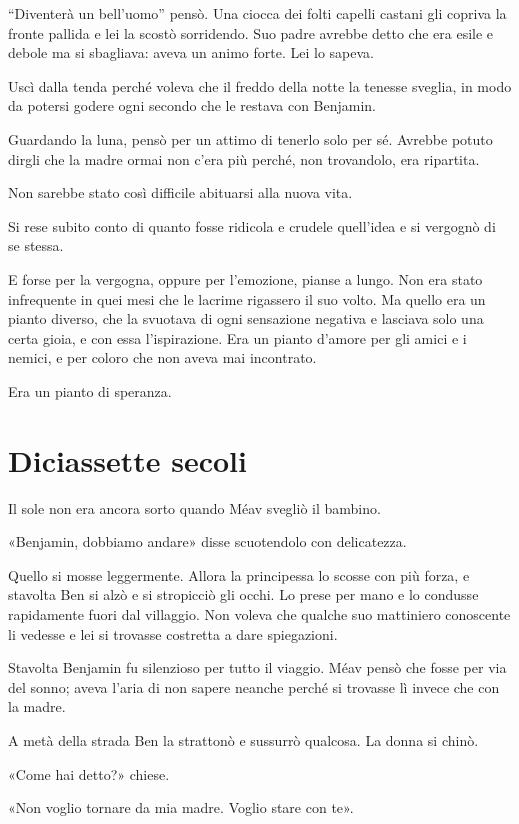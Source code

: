 \documentclass[a4paper,11pt,oneside,openright,final]{memoir}
\begin{document}
``Diventerà un bell'uomo'' pensò. Una ciocca dei folti capelli castani gli
copriva la fronte pallida e lei la scostò sorridendo. Suo padre avrebbe detto
che era esile e debole ma si sbagliava: aveva un animo forte. Lei lo sapeva.

Uscì dalla tenda perché voleva che il freddo della notte la tenesse sveglia,
in modo da potersi godere ogni secondo che le restava con Benjamin.

Guardando la luna, pensò per un attimo di tenerlo solo per sé. Avrebbe potuto
dirgli che la madre ormai non c'era più perché, non trovandolo, era ripartita.

Non sarebbe stato così difficile abituarsi alla nuova vita.

Si rese subito conto di quanto fosse ridicola e crudele quell'idea e si
vergognò di se stessa.

E forse per la vergogna, oppure per l'emozione, pianse a lungo. Non era stato
infrequente in quei mesi che le lacrime rigassero il suo volto. Ma quello era un
pianto diverso, che la svuotava di ogni sensazione negativa e lasciava solo una
certa gioia, e con essa l'ispirazione. Era un pianto d'amore per gli amici e i
nemici, e per coloro che non aveva mai incontrato.

Era un pianto di speranza.

\chapter{Diciassette secoli}

Il sole non era ancora sorto quando Méav svegliò il bambino.

«Benjamin, dobbiamo andare» disse scuotendolo con delicatezza.

Quello si mosse leggermente. Allora la principessa lo scosse con più forza, e
stavolta Ben si alzò e si stropicciò gli occhi. Lo prese per mano e lo
condusse rapidamente fuori dal villaggio. Non voleva che qualche suo mattiniero
conoscente li vedesse e lei si trovasse costretta a dare spiegazioni.

Stavolta Benjamin fu silenzioso per tutto il viaggio. Méav pensò che fosse per
via del sonno; aveva l'aria di non sapere neanche perché si trovasse lì invece
che con la madre.

A metà della strada Ben la strattonò e sussurrò qualcosa. La donna si chinò.

«Come hai detto?» chiese.

«Non voglio tornare da mia madre. Voglio stare con te».
\end{document}
